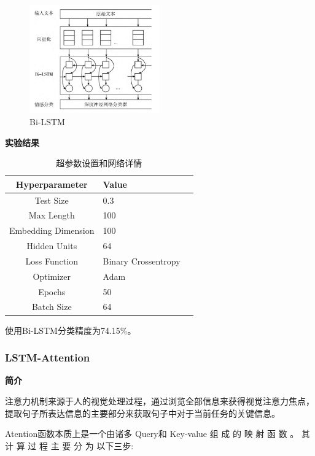 \documentclass[hyperref,a4paper,UTF8]{ctexart}
\begin{document}
\begin{figure}[ht]
	\centering
	\includegraphics[width=0.5\textwidth]{fig/pic3.png}
	\caption{Bi-LSTM}
    \label{fig:example}
\end{figure}

\newpage

\textbf{实验结果}

\begin{table}[ht]
    \centering
    \begin{tabular}{c|lr}
        \toprule
        \textbf{Hyperparameter} & \textbf{Value} \\
        \midrule
        Test Size & 0.3 \\
        Max Length & 100 \\
        Embedding Dimension & 100 \\
        Hidden Units & 64 \\
        Loss Function & Binary Crossentropy \\
        Optimizer & Adam \\
        Epochs & 50 \\
        Batch Size & 64 \\
        \bottomrule
    \end{tabular}
    \caption{超参数设置和网络详情}
    \label{tab:hyperparameters}
\end{table}

使用Bi-LSTM分类精度为74.15\%。


\subsubsection{LSTM-Attention}


\textbf{简介}


注意力机制来源于人的视觉处理过程，通过浏览全部信息来获得视觉注意力焦点，提取句子所表达信息的主要部分来获取句子中对于当前任务的关键信息。


Atention函数本质上是一个由诸多 Query和 Key-value 组 成 的 映 射 函 数 。 其 计 算 过 程 主 要 分 为 以下三步:
\end{document}
